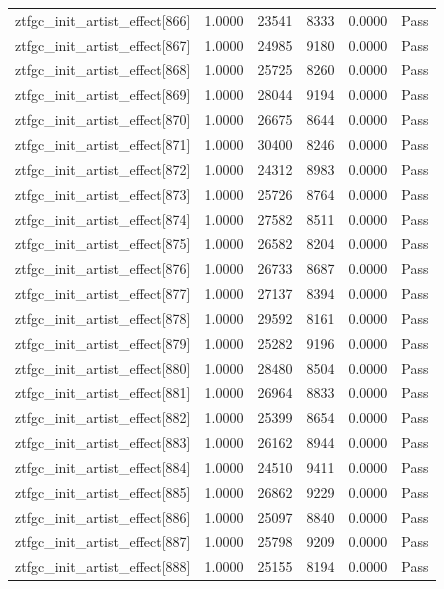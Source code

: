 \begin{table}[htbp]
\begin{tabular}{llrrll}
ztfgc\_init\_artist\_effect[866] & 1.0000 & 23541 & 8333 & 0.0000 & Pass \\
ztfgc\_init\_artist\_effect[867] & 1.0000 & 24985 & 9180 & 0.0000 & Pass \\
ztfgc\_init\_artist\_effect[868] & 1.0000 & 25725 & 8260 & 0.0000 & Pass \\
ztfgc\_init\_artist\_effect[869] & 1.0000 & 28044 & 9194 & 0.0000 & Pass \\
ztfgc\_init\_artist\_effect[870] & 1.0000 & 26675 & 8644 & 0.0000 & Pass \\
ztfgc\_init\_artist\_effect[871] & 1.0000 & 30400 & 8246 & 0.0000 & Pass \\
ztfgc\_init\_artist\_effect[872] & 1.0000 & 24312 & 8983 & 0.0000 & Pass \\
ztfgc\_init\_artist\_effect[873] & 1.0000 & 25726 & 8764 & 0.0000 & Pass \\
ztfgc\_init\_artist\_effect[874] & 1.0000 & 27582 & 8511 & 0.0000 & Pass \\
ztfgc\_init\_artist\_effect[875] & 1.0000 & 26582 & 8204 & 0.0000 & Pass \\
ztfgc\_init\_artist\_effect[876] & 1.0000 & 26733 & 8687 & 0.0000 & Pass \\
ztfgc\_init\_artist\_effect[877] & 1.0000 & 27137 & 8394 & 0.0000 & Pass \\
ztfgc\_init\_artist\_effect[878] & 1.0000 & 29592 & 8161 & 0.0000 & Pass \\
ztfgc\_init\_artist\_effect[879] & 1.0000 & 25282 & 9196 & 0.0000 & Pass \\
ztfgc\_init\_artist\_effect[880] & 1.0000 & 28480 & 8504 & 0.0000 & Pass \\
ztfgc\_init\_artist\_effect[881] & 1.0000 & 26964 & 8833 & 0.0000 & Pass \\
ztfgc\_init\_artist\_effect[882] & 1.0000 & 25399 & 8654 & 0.0000 & Pass \\
ztfgc\_init\_artist\_effect[883] & 1.0000 & 26162 & 8944 & 0.0000 & Pass \\
ztfgc\_init\_artist\_effect[884] & 1.0000 & 24510 & 9411 & 0.0000 & Pass \\
ztfgc\_init\_artist\_effect[885] & 1.0000 & 26862 & 9229 & 0.0000 & Pass \\
ztfgc\_init\_artist\_effect[886] & 1.0000 & 25097 & 8840 & 0.0000 & Pass \\
ztfgc\_init\_artist\_effect[887] & 1.0000 & 25798 & 9209 & 0.0000 & Pass \\
ztfgc\_init\_artist\_effect[888] & 1.0000 & 25155 & 8194 & 0.0000 & Pass \\

\end{tabular}
\end{table}

